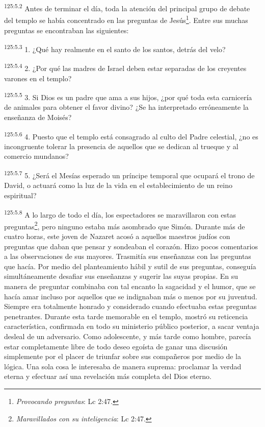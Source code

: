 \par
\textsuperscript{125:5.2} Antes de terminar el día, toda la atención del principal grupo de debate del templo se había concentrado en las preguntas de Jesús\footnote{\textit{Provocando preguntas}: Lc 2:47.}. Entre sus muchas preguntas se encontraban las siguientes:

\par
\textsuperscript{125:5.3} 1. ¿Qué hay realmente en el santo de los santos, detrás del velo?

\par
\textsuperscript{125:5.4} 2. ¿Por qué las madres de Israel deben estar separadas de los creyentes varones en el templo?

\par
\textsuperscript{125:5.5} 3. Si Dios es un padre que ama a sus hijos, ¿por qué toda esta carnicería de animales para obtener el favor divino? ¿Se ha interpretado erróneamente la enseñanza de Moisés?

\par
\textsuperscript{125:5.6} 4. Puesto que el templo está consagrado al culto del Padre celestial, ¿no es incongruente tolerar la presencia de aquellos que se dedican al trueque y al comercio mundanos?

\par
\textsuperscript{125:5.7} 5. ¿Será el Mesías esperado un príncipe temporal que ocupará el trono de David, o actuará como la luz de la vida en el establecimiento de un reino espiritual?

\par
\textsuperscript{125:5.8} A lo largo de todo el día, los espectadores se maravillaron con estas preguntas\footnote{\textit{Maravillados con su inteligencia}: Lc 2:47.}, pero ninguno estaba más asombrado que Simón. Durante más de cuatro horas, este joven de Nazaret acosó a aquellos maestros judíos con preguntas que daban que pensar y sondeaban el corazón. Hizo pocos comentarios a las observaciones de sus mayores. Trasmitía sus enseñanzas con las preguntas que hacía. Por medio del planteamiento hábil y sutil de sus preguntas, conseguía simultáneamente desafiar sus enseñanzas y sugerir las suyas propias. En su manera de preguntar combinaba con tal encanto la sagacidad y el humor, que se hacía amar incluso por aquellos que se indignaban más o menos por su juventud. Siempre era totalmente honrado y considerado cuando efectuaba estas preguntas penetrantes. Durante esta tarde memorable en el templo, mostró su reticencia característica, confirmada en todo su ministerio público posterior, a sacar ventaja desleal de un adversario. Como adolescente, y más tarde como hombre, parecía estar completamente libre de todo deseo egoísta de ganar una discusión simplemente por el placer de triunfar sobre sus compañeros por medio de la lógica. Una sola cosa le interesaba de manera suprema: proclamar la verdad eterna y efectuar así una revelación más completa del Dios eterno.

